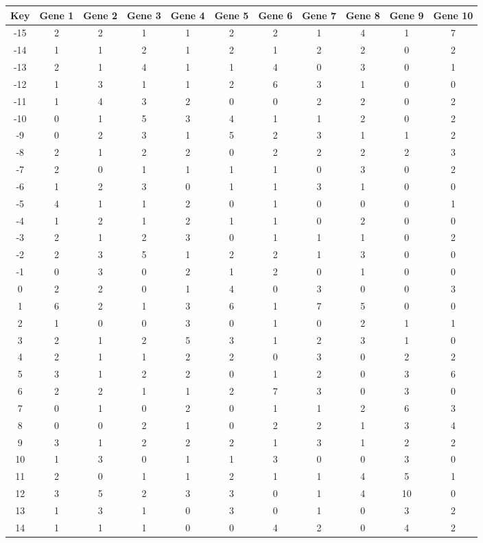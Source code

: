 \begin{tabular}{|c|c|c|c|c|c|c|c|c|c|c|}
\hline
Key & Gene 1 & Gene 2 & Gene 3 & Gene 4 & Gene 5 & Gene 6 & Gene 7 & Gene 8 & Gene 9 & Gene 10 \\
\hline
-15 & 2 & 2 & 1 & 1 & 2 & 2 & 1 & 4 & 1 & 7 \\
-14 & 1 & 1 & 2 & 1 & 2 & 1 & 2 & 2 & 0 & 2 \\
-13 & 2 & 1 & 4 & 1 & 1 & 4 & 0 & 3 & 0 & 1 \\
-12 & 1 & 3 & 1 & 1 & 2 & 6 & 3 & 1 & 0 & 0 \\
-11 & 1 & 4 & 3 & 2 & 0 & 0 & 2 & 2 & 0 & 2 \\
-10 & 0 & 1 & 5 & 3 & 4 & 1 & 1 & 2 & 0 & 2 \\
-9 & 0 & 2 & 3 & 1 & 5 & 2 & 3 & 1 & 1 & 2 \\
-8 & 2 & 1 & 2 & 2 & 0 & 2 & 2 & 2 & 2 & 3 \\
-7 & 2 & 0 & 1 & 1 & 1 & 1 & 0 & 3 & 0 & 2 \\
-6 & 1 & 2 & 3 & 0 & 1 & 1 & 3 & 1 & 0 & 0 \\
-5 & 4 & 1 & 1 & 2 & 0 & 1 & 0 & 0 & 0 & 1 \\
-4 & 1 & 2 & 1 & 2 & 1 & 1 & 0 & 2 & 0 & 0 \\
-3 & 2 & 1 & 2 & 3 & 0 & 1 & 1 & 1 & 0 & 2 \\
-2 & 2 & 3 & 5 & 1 & 2 & 2 & 1 & 3 & 0 & 0 \\
-1 & 0 & 3 & 0 & 2 & 1 & 2 & 0 & 1 & 0 & 0 \\
0 & 2 & 2 & 0 & 1 & 4 & 0 & 3 & 0 & 0 & 3 \\
1 & 6 & 2 & 1 & 3 & 6 & 1 & 7 & 5 & 0 & 0 \\
2 & 1 & 0 & 0 & 3 & 0 & 1 & 0 & 2 & 1 & 1 \\
3 & 2 & 1 & 2 & 5 & 3 & 1 & 2 & 3 & 1 & 0 \\
4 & 2 & 1 & 1 & 2 & 2 & 0 & 3 & 0 & 2 & 2 \\
5 & 3 & 1 & 2 & 2 & 0 & 1 & 2 & 0 & 3 & 6 \\
6 & 2 & 2 & 1 & 1 & 2 & 7 & 3 & 0 & 3 & 0 \\
7 & 0 & 1 & 0 & 2 & 0 & 1 & 1 & 2 & 6 & 3 \\
8 & 0 & 0 & 2 & 1 & 0 & 2 & 2 & 1 & 3 & 4 \\
9 & 3 & 1 & 2 & 2 & 2 & 1 & 3 & 1 & 2 & 2 \\
10 & 1 & 3 & 0 & 1 & 1 & 3 & 0 & 0 & 3 & 0 \\
11 & 2 & 0 & 1 & 1 & 2 & 1 & 1 & 4 & 5 & 1 \\
12 & 3 & 5 & 2 & 3 & 3 & 0 & 1 & 4 & 10 & 0 \\
13 & 1 & 3 & 1 & 0 & 3 & 0 & 1 & 0 & 3 & 2 \\
14 & 1 & 1 & 1 & 0 & 0 & 4 & 2 & 0 & 4 & 2 \\
\hline
\end{tabular}